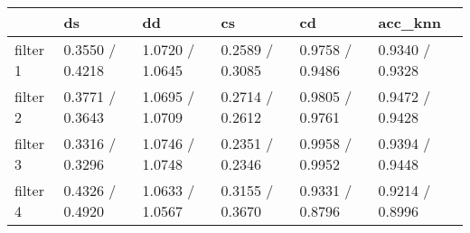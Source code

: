 \begin{tabular}{llllll}
\toprule
{} &               ds &               dd &               cs &               cd &          acc\_knn \\
\midrule
filter 1 &  0.3550 / 0.4218 &  1.0720 / 1.0645 &  0.2589 / 0.3085 &  0.9758 / 0.9486 &  0.9340 / 0.9328 \\
filter 2 &  0.3771 / 0.3643 &  1.0695 / 1.0709 &  0.2714 / 0.2612 &  0.9805 / 0.9761 &  0.9472 / 0.9428 \\
filter 3 &  0.3316 / 0.3296 &  1.0746 / 1.0748 &  0.2351 / 0.2346 &  0.9958 / 0.9952 &  0.9394 / 0.9448 \\
filter 4 &  0.4326 / 0.4920 &  1.0633 / 1.0567 &  0.3155 / 0.3670 &  0.9331 / 0.8796 &  0.9214 / 0.8996 \\
\bottomrule
\end{tabular}
